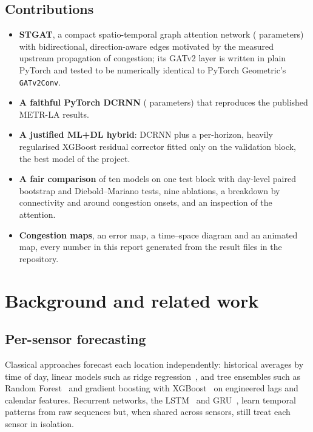 \documentclass[11pt,a4paper]{article}
\begin{document}
\subsection{Contributions}
\begin{itemize}
\item \textbf{STGAT}, a compact spatio-temporal graph attention network (\StgatParams{} parameters) with bidirectional,
direction-aware edges motivated by the measured upstream propagation of congestion; its GATv2 layer is written in plain
PyTorch and tested to be numerically identical to PyTorch Geometric's \texttt{GATv2Conv}.
\item \textbf{A faithful PyTorch DCRNN} (\DcrnnParams{} parameters) that reproduces the published METR-LA results.
\item \textbf{A justified ML+DL hybrid}: DCRNN plus a per-horizon, heavily regularised XGBoost residual corrector fitted
only on the validation block, the best model of the project.
\item \textbf{A fair comparison} of ten models on one test block with day-level paired bootstrap and Diebold--Mariano
tests, nine ablations, a breakdown by connectivity and around congestion onsets, and an inspection of the attention.
\item \textbf{Congestion maps}, an error map, a time--space diagram and an animated map, every number in this report
generated from the result files in the repository.
\end{itemize}

\section{Background and related work}\label{sec:related}

\subsection{Per-sensor forecasting}
Classical approaches forecast each location independently: historical averages by time of day, linear models such as
ridge regression~\citep{hoerl1970ridge}, and tree ensembles such as Random Forest~\citep{breiman2001rf} and gradient
boosting with XGBoost~\citep{chen2016xgboost} on engineered lags and calendar features. Recurrent networks, the
LSTM~\citep{hochreiter1997lstm} and GRU~\citep{cho2014gru}, learn temporal patterns from raw sequences but, when shared
across sensors, still treat each sensor in isolation.
\end{document}
